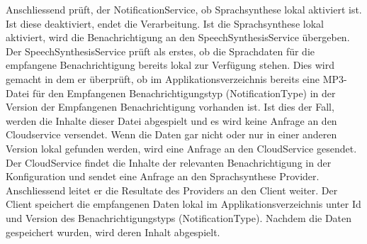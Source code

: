 Anschliessend prüft, der NotificationService, ob Sprachsynthese lokal aktiviert ist.
Ist diese deaktiviert, endet die Verarbeitung.
Ist die Sprachsynthese lokal aktiviert, wird die Benachrichtigung an den SpeechSynthesisService übergeben.
Der SpeechSynthesisService prüft als erstes, ob die Sprachdaten für die empfangene Benachrichtigung bereits lokal zur Verfügung stehen.
Dies wird gemacht in dem er überprüft, ob im Applikationsverzeichnis bereits eine MP3-Datei für den Empfangenen Benachrichtigungstyp (NotificationType) in der Version der Empfangenen Benachrichtigung vorhanden ist.
Ist dies der Fall, werden die Inhalte dieser Datei abgespielt und es wird keine Anfrage an den Cloudservice versendet.
Wenn die Daten gar nicht oder nur in einer anderen Version lokal gefunden werden, wird eine Anfrage an den CloudService gesendet.
Der CloudService findet die Inhalte der relevanten Benachrichtigung in der Konfiguration und sendet eine Anfrage an den Sprachsynthese Provider.
Anschliessend leitet er die Resultate des Providers an den Client weiter.
Der Client speichert die empfangenen Daten lokal im Applikationsverzeichnis unter Id und Version des Benachrichtigungstyps (NotificationType).
Nachdem die Daten gespeichert wurden, wird deren Inhalt abgespielt.

\clearpage
